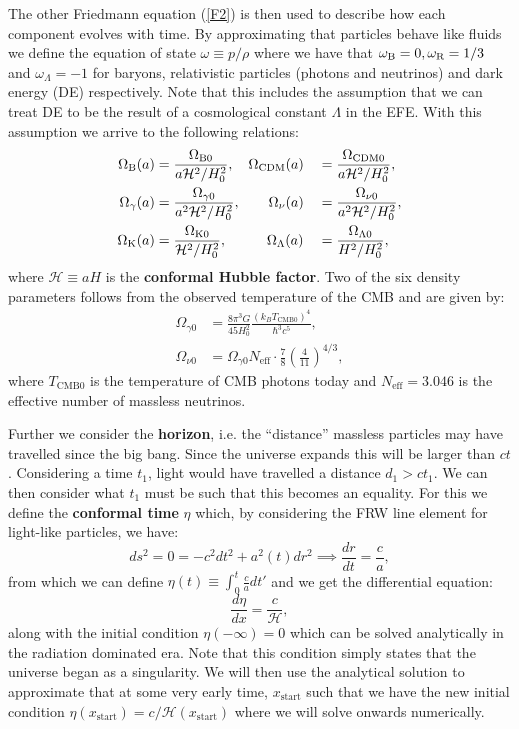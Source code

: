 \documentclass[%
reprint,
 amsmath,amssymb,
 aps,
]{revtex4-2}
\newcommand{\Hp}{\mathcal{H}}
\begin{document}
The other Friedmann equation (\ref{F2}) is then used to describe how each component evolves with time. By approximating that particles behave like fluids we define the equation of state $\omega\equiv p/\rho$ where we have that $\omega_{\text B}=0,\omega_{\text{R}}=1/3$ and $\omega_\Lambda=-1$ for baryons, relativistic particles (photons and neutrinos) and dark energy (DE) respectively. Note that this includes the assumption that we can treat DE to be the result of a cosmological constant $\Lambda$ in the EFE. With this assumption we arrive to the following relations:
\begin{alignat}{2}
	\Omega_{\text B}(a)&=\frac{\Omega_{\text B0}}{a\Hp^2/H_0^2},\hspace{3.5mm}\Omega_{\text{CDM}}(a)&&=\frac{\Omega_{\text{CDM}0}}{a\Hp^2/H_0^2},\nonumber\\
	\Omega_{\gamma}(a)&=\frac{\Omega_{\gamma0}}{a^2\Hp^2/H_0^2},\hspace{7mm}\Omega_{\nu}(a)&&=\frac{\Omega_{\nu0}}{a^2\Hp^2/H_0^2},\label{eq:Omegai}\\
	\Omega_{\text K}(a)&=\frac{\Omega_{\text K0}}{\Hp^2/H_0^2},\hspace{10mm}\Omega_{\Lambda}(a)&&=\frac{\Omega_{\Lambda0}}{H^2/H_0^2},\nonumber
\end{alignat}
where $\Hp\equiv aH$ is the \textbf{conformal Hubble factor}. 
Two of the six density parameters follows from the observed temperature of the CMB and are given by:
\begin{align}
	\label{ORad}
	\Omega_{\gamma0}&=\frac{8\pi^3 G}{45 H_0^2}\frac{(k_BT_{\text{CMB}0})^4}{\hbar^3 c^5},\\
	\label{ONu}
	\Omega_{\nu0}&=\Omega_{\gamma0}N_{\text{eff}}\cdot\frac{7}{8}\left(\frac{4}{11}\right)^{4/3},
\end{align}
where $T_{\text{CMB}0}$ is the temperature of CMB photons today and $N_{\text{eff}}=3.046$ is the effective number of massless neutrinos. 

Further we consider the \textbf{horizon}, i.e. the ``distance'' massless particles may have travelled since the big bang. Since the universe expands this will be larger than $ct$. Considering a time $t_1$, light would have travelled a distance $d_1>ct_1$. We can then consider what $t_1$ must be such that this becomes an equality. For this we define the \textbf{conformal time} $\eta$ which, by considering the FRW line element for light-like particles, we have:
\[ds^2=0=-c^2dt^2+a^2(t)dr^2\implies \frac{dr}{dt}=\frac{c}{a},\]
from which we can define $\eta(t)\equiv\int_0^t\frac{c}{a}dt'$ and we get the differential equation:
\begin{equation}
	\frac{d\eta}{dx}=\frac{c}{\Hp},\label{detaODE}
\end{equation}
along with the initial condition $\eta(-\infty)=0$ which can be solved analytically in the radiation dominated era. Note that this condition simply states that the universe began as a singularity. We will then use the analytical solution to approximate that at some very early time, $x_\text{start}$ such that we have the new initial condition $\eta(x_\text{start})=c/\Hp(x_\text{start})$ where we will solve onwards numerically. 
\end{document}
